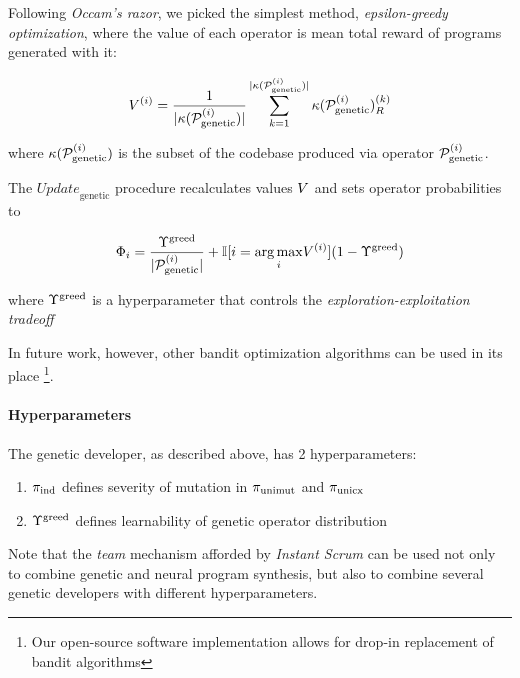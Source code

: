 Following \emph{Occam's razor}, we picked the simplest method, \emph{epsilon-greedy optimization}, where the value of each operator is mean total reward of programs generated with it:

\begin{equation}
    V^{(i)} = \frac{1}{|\kappa(\mathcal{P}_\text{genetic}^{(i)})|} 
    \sum\limits_{k=1}^{|\kappa(\mathcal{P}_\text{genetic}^{(i)})|}
    \kappa(\mathcal{P}_\text{genetic}^{(i)})_R^{(k)} 
\end{equation}

where $\kappa(\mathcal{P}_\text{genetic}^{(i)})$ is the subset of the codebase produced via operator $\mathcal{P}_\text{genetic}^{(i)}$.

The $\mathit{Update}_\text{genetic}$ procedure recalculates values $V$ and sets operator probabilities to

\begin{equation}
    \Phi_i = \frac{\Upsilon^\text{greed}}{|\mathcal{P}_\text{genetic}^{(i)}|} +
    \mathbb{I}[i = \underset{i}{\arg\max} V^{(i)}] (1 - \Upsilon^\text{greed})
\end{equation}

where $\Upsilon^\text{greed}$ is a hyperparameter that controls the \emph{exploration-exploitation tradeoff} \cite{banditsexplo}

In future work, however, other bandit optimization algorithms can be used in its place \footnote{Our open-source software implementation allows for drop-in replacement of bandit algorithms}.

\paragraph{Hyperparameters}
\label{sec:genhyper}

The genetic developer, as described above, has 2 hyperparameters:

\begin{enumerate}
    \item $\pi_\text{ind}$ defines severity of mutation in $\pi_\text{unimut}$ and $\pi_\text{unicx}$
    \item $\Upsilon^\text{greed}$ defines learnability of genetic operator distribution
\end{enumerate}

Note that the \emph{team} mechanism afforded by \emph{Instant Scrum} can be used not only to combine genetic and neural program synthesis, but also to combine several genetic developers with different hyperparameters.


